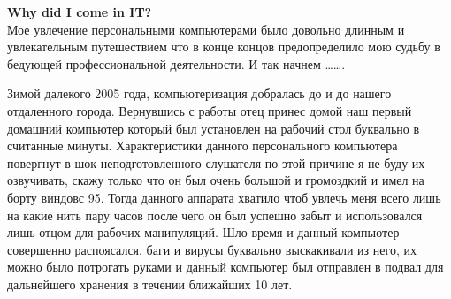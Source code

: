 \documentclass[14pt,a4paper,oneside]{extbook}
\begin{document}
		\noindent\textbf{Why did I come in IT?}\\
		
		Мое увлечение персональными компьютерами было довольно длинным и увлекательным путешествием что в конце концов предопределило мою судьбу в бедующей профессиональной деятельности. И так начнем …….
		
		Зимой далекого 2005 года, компьютеризация добралась до и до нашего отдаленного города. Вернувшись с работы отец принес домой наш первый домашний компьютер который был установлен на рабочий стол буквально в считанные минуты. Характеристики данного персонального компьютера повергнут в шок неподготовленного слушателя по этой причине я не буду их озвучивать, скажу только что он был очень большой и громоздкий и имел на борту виндовс 95. Тогда данного аппарата хватило чтоб увлечь меня всего лишь на какие нить пару часов после чего он был успешно забыт и использовался лишь отцом для рабочих манипуляций. Шло время и данный компьютер совершенно распоясался, баги и вирусы буквально выскакивали из него, их можно было потрогать руками и данный компьютер был отправлен в подвал для дальнейшего хранения в течении ближайших 10 лет.
		
\end{document}
